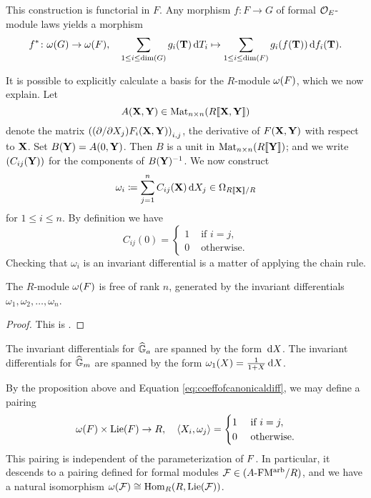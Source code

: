 \documentclass[../main.tex]{subfiles}
\begin{document}
This construction is functorial in $F$. Any morphism $f\colon F \to G$ 
of formal ${\mathcal{O}_E}$-module laws yields a morphism 
$$ f^*\colon \omega(G) \to \omega(F), \quad \sum_{1 \leq i \leq \dim(G)} g_i(\mathbf T)
\, \mathrm{d} T_i  \mapsto \sum_{1 \leq i \leq \dim(F)} g_i(f(\mathbf T)) \, \mathrm{d} f_i(\mathbf T).$$

It is possible to explicitly calculate a basis for the $R$-module
$\omega({F})$, which we now explain. Let 
$$A(\mathbf{X}, \mathbf{Y}) \in \operatorname{Mat}_{n \times n} (R\llbracket \mathbf{X}, \mathbf{Y} \rrbracket)$$ 
denote the matrix $\left((\partial/\partial X_j)F_i (\mathbf{X},\mathbf{Y})\right)_{i,j}$,
the derivative of ${F}(\mathbf{X},\mathbf{Y})$ with respect to $\mathbf{X}$. Set 
$B(\mathbf{Y}) = A(0,\mathbf{Y})$. Then $B$ is a unit in $\operatorname{Mat}_{n \times n} (R\llbracket \mathbf{Y} \rrbracket)$; 
and we write $(C_{ij}(\mathbf{Y}))$ for the components of 
$B(\mathbf{Y})^{-1}$. We now construct 
$$\omega_{i} \coloneqq \sum_{j=1}^n C_{ij}(\mathbf{X}) \, \mathrm{d} X_j \in \Omega_{R\llbracket \mathbf{X} \rrbracket/R}$$ 
for $1 \leq i \leq n$. By definition we have 
\begin{equation}\label{eq:coeffofcanonicaldiff}
  C_{ij}(0) = \begin{cases}
    1 &\text{ if }i = j,\\
    0 &\text{ otherwise.}
  \end{cases}
\end{equation}
Checking that $\omega_{i}$ is an invariant differential is a matter of 
applying the chain rule. 
\begin{prop}
    The $R$-module $\omega({F})$ is free of rank $n$, generated by the invariant
    differentials $\omega_{1}, \omega_{2}, \dots, \omega_{n}$.
\begin{proof}
  This is \cite[Proposition 1.1]{honda1970formalgroups}. 
\end{proof}
\end{prop}
\begin{xpl}
  The invariant differentials for $\widehat{\mathbb{G}}_a$ are spanned by the form $\, \mathrm{d} X$. 
  The invariant differentials for $\widehat{\mathbb{G}}_m$ are spanned by the form 
  $\omega_1(X) = \frac 1{1+X} \, \mathrm{d} X$.
\end{xpl}
By the proposition above and Equation \eqref{eq:coeffofcanonicaldiff}, we may
define a pairing
\begin{equation*}
  \omega({F}) \times \operatorname{Lie}({F}) \to R, \quad \langle X_i, \omega_j \rangle =
  \begin{cases}
    1 &\text{ if } i = j,\\
    0 &\text{ otherwise.}
  \end{cases}
\end{equation*}
This pairing is independent of the parameterization of ${F}$. In particular, it
descends to a pairing defined for formal modules $\mathcal{F} \in {({A}\textnormal-\allowbreak\mathrm{FM^{arb}}/{R})}$, and
we have a natural isomorphism $\omega(\mathcal{F}) \cong \operatorname{Hom}_R(R, \operatorname{Lie}(\mathcal{F}))$.
\end{document}
